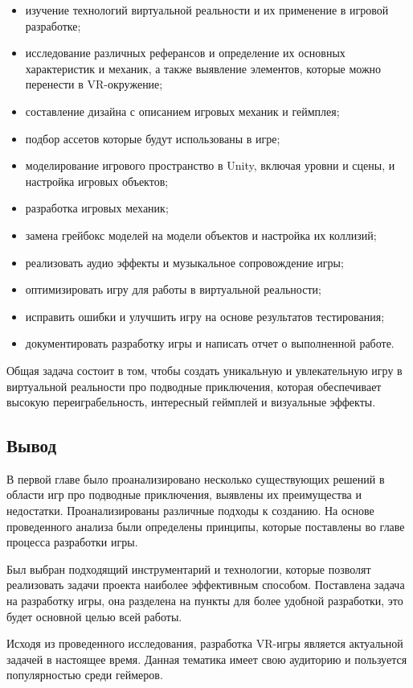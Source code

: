 \documentclass{../mirea-prog-lang}
\begin{document}
\begin{itemize}
	\item изучение технологий виртуальной реальности и их применение в игровой разработке;
	\item исследование различных реферансов и определение их основных характеристик и механик, а также выявление элементов, которые можно перенести в VR-окружение;
	\item составление дизайна с описанием игровых механик и геймплея;
	\item подбор ассетов которые будут использованы в игре;
	\item моделирование игрового пространство в Unity, включая уровни и сцены, и настройка игровых объектов;
	\item разработка игровых механик;
	\item замена грейбокс моделей на модели объектов и настройка их коллизий;
	\item реализовать аудио эффекты и музыкальное сопровождение игры;
	\item оптимизировать игру для работы в виртуальной реальности;
	\item исправить ошибки и улучшить игру на основе результатов тестирования;
	\item документировать разработку игры и написать отчет о выполненной работе.
\end{itemize}

Общая задача состоит в том, чтобы создать уникальную и увлекательную игру в виртуальной реальности про подводные приключения, которая обеспечивает высокую переиграбельность, интересный геймплей и визуальные эффекты.

\subsection{Вывод}

В первой главе было проанализировано несколько существующих решений в области игр про подводные приключения, выявлены их преимущества и недостатки. Проанализированы различные подходы к созданию. На основе проведенного анализа были определены принципы, которые поставлены во главе процесса разработки игры.

Был выбран подходящий инструментарий и технологии, которые позволят реализовать задачи проекта наиболее эффективным способом.
Поставлена задача на разработку игры, она разделена на пункты для более удобной разработки, это будет основной целью всей работы.

Исходя из проведенного исследования, разработка VR-игры является актуальной задачей в настоящее время. Данная тематика имеет свою аудиторию и пользуется популярностью среди геймеров.
\end{document}
